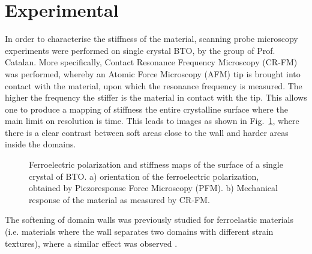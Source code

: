 {\section{Experimental}
In order to characterise the stiffness of the material, scanning probe microscopy experiments were performed on single crystal BTO, by the group of Prof. Catalan. More specifically, Contact Resonance Frequency Microscopy (CR-FM) was performed, whereby an Atomic Force Microscopy (AFM) tip is brought into contact with the material, upon which the resonance frequency is measured. The higher the frequency the stiffer is the material in contact with the tip. This allows one to produce a mapping of stiffness the entire crystalline surface where the main limit on resolution is time. This leads to images as shown in Fig.~\ref{fig:BTO_experiment}, where there is a clear contrast between soft areas close to the wall and harder areas inside the domains.
\begin{figure}
	\caption{\label{fig:BTO_experiment} Ferroelectric polarization and stiffness maps of the surface of a single crystal of BTO. a) orientation of the ferroelectric polarization, obtained by Piezoresponse Force Microscopy (PFM). b) Mechanical response of the material as measured by CR-FM.}
\end{figure}
The softening of domain walls was previously studied for ferroelastic materials (i.e. materials where the wall separates two domains with different strain textures), where a similar effect was observed \cite{Lee2003}.


}
